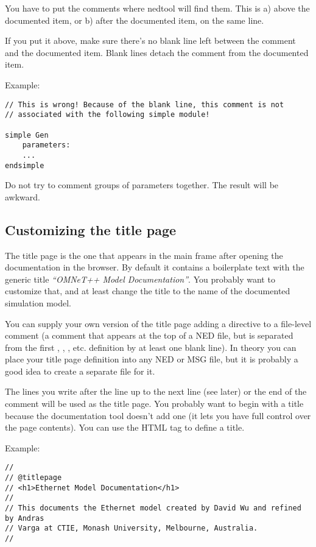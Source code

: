 You have to put the comments where nedtool will find them.
This is a) above the documented item, or b) after the
documented item, on the same line.

If you put it above, make sure there's no blank line left
between the comment and the documented item. Blank lines
detach the comment from the documented item.

Example:
\begin{verbatim}
// This is wrong! Because of the blank line, this comment is not
// associated with the following simple module!

simple Gen
    parameters:
    ...
endsimple
\end{verbatim}

Do not try to comment groups of parameters together. The result
will be awkward.


\subsection{Customizing the title page}

The title page is the one that appears in the main frame after
opening the documentation in the browser. By default it contains
a boilerplate text with the generic title \textit{``OMNeT++ Model Documentation''}.
You probably want to customize that, and at least change the title
to the name of the documented simulation model.

You can supply your own version of the title page adding a 
directive to a file-level comment (a comment that appears at the top of
a NED file, but is separated from the first , ,
, etc. definition by at least one blank line).
In theory you can place your title page definition into
any NED or MSG file, but it is probably a good idea to create
a separate  file for it.

The lines you write after the  line up to the next
 line (see later) or the end of the comment will be used
as the title page.
You probably want to begin with a title because the documentation
tool doesn't add one (it lets you have full control over the
page contents). You can use the  HTML tag
to define a title.

Example:

\begin{verbatim}
//
// @titlepage
// <h1>Ethernet Model Documentation</h1>
//
// This documents the Ethernet model created by David Wu and refined by Andras
// Varga at CTIE, Monash University, Melbourne, Australia.
//
\end{verbatim}


